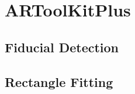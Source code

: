 \section{ARToolKitPlus} %
\label{sec:artoolkitplus}

\subsection{Fiducial Detection} %
\label{sec:fiducial_detection}


\subsection{Rectangle Fitting} %
\label{sec:rectangle_fitting}


